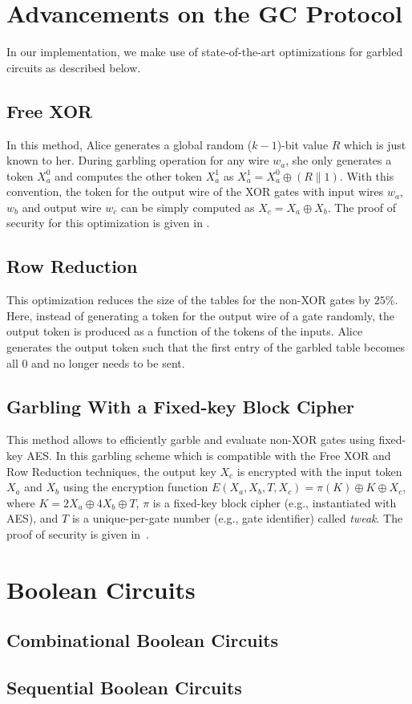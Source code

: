 \section{Advancements on the GC Protocol}
In our implementation, we make use of state-of-the-art optimizations for garbled circuits as described below.

\subsection{Free XOR~\cite{kolesnikov2008improved}}
In this method, Alice generates a global random ($k-1$)-bit value $R$ which is just known to her.
During garbling operation for any wire $w_a$, she only generates a token $X_a^{0}$ and computes the other token $X_a^{1}$ as $X_a^{1} = X_a^{0} \oplus (R \parallel 1)$.
With this convention, the token for the output wire of the XOR gates with input wires $w_{a}$, $w_{b}$ and output wire $w_{c}$ can be simply computed as $X_{c} = X_{a} \oplus X_{b}$.
The proof of security for this optimization is given in \cite{kolesnikov2008improved}.

\subsection{Row Reduction~\cite{naor1999privacy}}
This optimization reduces the size of the tables for the non-XOR gates by $25\%$.
Here, instead of generating a token for the output wire of a gate randomly, the output token is produced as a function of the tokens of the inputs.
Alice generates the output token such that the first entry of the garbled table becomes all $0$ and no longer needs to be sent.

\subsection{Garbling With a Fixed-key Block Cipher~\cite{bellare2013efficient}}
This method allows to efficiently garble and evaluate non-XOR gates using fixed-key AES.
In this garbling scheme which is compatible with the Free XOR and Row Reduction techniques, the output key $X_{c}$ is encrypted with the input token $X_{a}$ and $X_{b}$ using the encryption function $E(X_a,X_b,T,X_c) = \pi(K) \oplus K \oplus X_c$, where $K=2X_a\oplus4X_b\oplus T$, $\pi$ is a fixed-key block cipher (e.g., instantiated with AES), and $T$ is a unique-per-gate number (e.g., gate identifier) called \emph{tweak}.
The proof of security is given in~\cite{bellare2013efficient}.



\section{Boolean Circuits}
\subsection{Combinational Boolean Circuits}
\subsection{Sequential Boolean Circuits}
